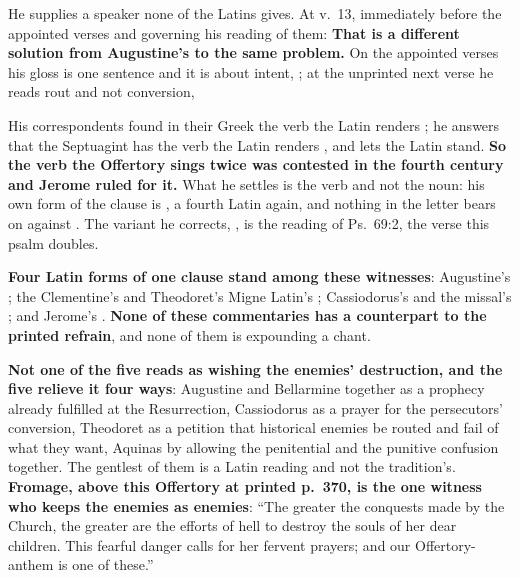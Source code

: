 \begin{witnessnote}
He supplies a speaker none of the Latins gives. At v.~13, immediately before the
appointed verses and governing his reading of them:  \textbf{That is
a different solution from Augustine's  to the same
problem.} On the appointed verses his gloss is one sentence and it is about
intent, ; at the
unprinted next verse he reads rout and not conversion, 
\end{witnessnote}

\begin{witnessnote}
 His correspondents
found in their Greek the verb the Latin renders ; he answers that
the Septuagint has the verb the Latin renders , and lets the
Latin stand.
\textbf{So the verb the Offertory sings twice was contested in the fourth century
and Jerome ruled for it.} What he settles is the verb and not the noun: his own
form of the clause is , a fourth Latin again,
and nothing in the letter bears on  against .
The variant he corrects, , is the reading of Ps.~69:2, the verse
this psalm doubles.
\end{witnessnote}

\textbf{Four Latin forms of one clause stand among these witnesses}: Augustine's
; the Clementine's and Theodoret's Migne
Latin's ; Cassiodorus's and the missal's
; and Jerome's . \textbf{None of these commentaries has a counterpart to the printed refrain},
and none of them is expounding a chant.

\textbf{Not one of the five reads  as wishing
the enemies' destruction, and the five relieve it four ways}: Augustine and
Bellarmine together as a prophecy already fulfilled at the Resurrection,
Cassiodorus as a prayer for the persecutors' conversion, Theodoret as a petition
that historical enemies be routed and fail of what they want, Aquinas by
allowing the penitential and the punitive confusion together. The gentlest of
them is a Latin reading and not the tradition's. \textbf{Fromage, above this Offertory at
printed p.~370, is the one witness who keeps the enemies as enemies}: ``The
greater the conquests made by the Church, the greater are the efforts of hell to
destroy the souls of her dear children. This fearful danger calls for her fervent
prayers; and our Offertory-anthem is one of these.''

